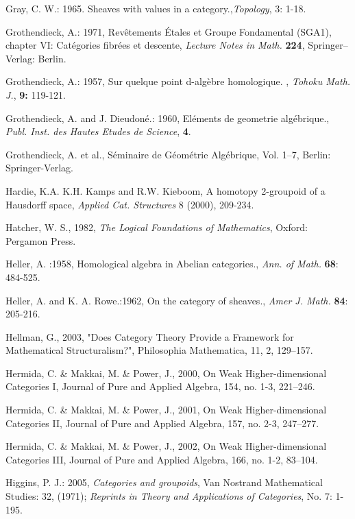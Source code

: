 \documentclass[12pt]{article}
\theoremstyle{plain}
\theoremstyle{definition}
\numberwithin{equation}{section}
\begin{document}
\begin{thebibliography}{199}
Gray, C. W.: 1965. Sheaves with values in a category.,\emph {Topology}, 3: 1-18.

Grothendieck, A.: 1971, Rev\^{e}tements \'Etales et Groupe Fondamental (SGA1),
chapter VI: Cat\'egories fibr\'ees et descente, \emph{Lecture Notes in Math.}
\textbf{224}, Springer--Verlag: Berlin.

Grothendieck, A.: 1957, Sur quelque point d-alg\`{e}bre homologique. , \emph{Tohoku Math. J.}, \textbf{9:} 119-121.

Grothendieck, A. and J. Dieudon\'{e}.: 1960, El\'{e}ments de geometrie alg\'{e}brique., \emph{Publ. Inst. des Hautes Etudes de Science}, \textbf{4}.

Grothendieck, A. et al., S\'eminaire de G\'eom\'etrie Alg\'ebrique, Vol. 1--7, Berlin: Springer-Verlag.

Hardie, K.A. K.H. Kamps and R.W. Kieboom, A homotopy 2-groupoid of a Hausdorff space, {\em Applied Cat. Structures} 8 (2000), 209-234.

Hatcher, W. S., 1982, {\em The Logical Foundations of Mathematics}, Oxford: Pergamon Press. 
  
Heller, A. :1958, Homological algebra in Abelian categories., \emph{Ann. of Math.}
\textbf{68}: 484-525.

Heller, A.  and K. A. Rowe.:1962, On the category of sheaves., \emph{Amer J. Math.}
\textbf{84}: 205-216.

Hellman, G., 2003, "Does Category Theory Provide a Framework for Mathematical Structuralism?", Philosophia Mathematica, 11, 2, 129--157. 

Hermida, C. \& Makkai, M. \& Power, J., 2000, On Weak Higher-dimensional Categories I, Journal of Pure and Applied Algebra, 154, no. 1-3, 221--246. 

Hermida, C. \& Makkai, M. \& Power, J., 2001, On Weak Higher-dimensional Categories II, Journal of Pure and Applied Algebra, 157, no. 2-3, 247--277.  

Hermida, C. \& Makkai, M. \& Power, J., 2002, On Weak Higher-dimensional Categories III, Journal of Pure and Applied Algebra, 166, no. 1-2, 83--104.  

Higgins, P. J.: 2005, \emph{Categories and groupoids}, Van Nostrand Mathematical Studies: 32, (1971); \emph{Reprints in
Theory and Applications of Categories}, No. 7: 1-195.


\end{thebibliography}
\end{document}
